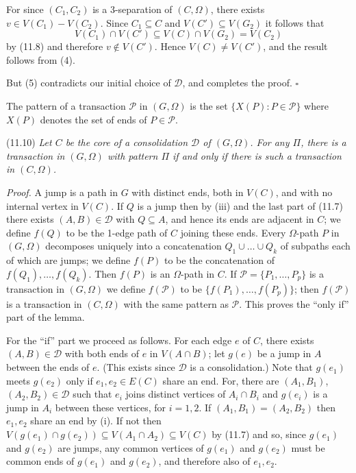 For since $(C_1, C_2)$ is a 3-separation of $(C, \Omega)$, there exists $v \in V(C_1) - V(C_2)$. Since $C_1 \subseteq C$ and $V(C') \subseteq V(G_2)$ it follows that
\begin{equation*}
V(C_1) \cap V(C') \subseteq V(C) \cap V(G_2) = V(C_2)
\end{equation*}
by (11.8) and therefore $v \notin V(C')$. Hence $V(C) \neq V(C')$, and the result follows from (4).

But (5) contradicts our initial choice of $\mathcal{D}$, and completes the proof. $\square$

The pattern of a transaction $\mathcal{P}$ in $(G, \Omega)$ is the set $\{X(P): P \in \mathcal{P}\}$ where $X(P)$ denotes the set of ends of $P \in \mathcal{P}$.

\stmt
(11.10) \textit{Let $C$ be the core of a consolidation $\mathcal{D}$ of $(G, \Omega)$. For any $\Pi$, there is a transaction in $(G, \Omega)$ with pattern $\Pi$ if and only if there is such a transaction in $(C, \Omega)$.}

\textit{Proof.} A jump is a path in $G$ with distinct ends, both in $V(C)$, and with no internal vertex in $V(C)$. If $Q$ is a jump then by (iii) and the last part of (11.7) there exists $(A, B) \in \mathcal{D}$ with $Q \subseteq A$, and hence its ends are adjacent in $C$; we define $f(Q)$ to be the 1-edge path of $C$ joining these ends. Every $\Omega$-path $P$ in $(G, \Omega)$ decomposes uniquely into a concatenation $Q_1 \cup \dots \cup Q_k$ of subpaths each of which are jumps; we define $f(P)$ to be the concatenation of $f(Q_1), \dots, f(Q_k)$. Then $f(P)$ is an $\Omega$-path in $C$. If $\mathcal{P} = \{P_1, \dots, P_p\}$ is a transaction in $(G, \Omega)$ we define $f(\mathcal{P})$ to be $\{f(P_1), \dots, f(P_p)\}$; then $f(\mathcal{P})$ is a transaction in $(C, \Omega)$ with the same pattern as $\mathcal{P}$. This proves the ``only if'' part of the lemma.

For the ``if'' part we proceed as follows. For each edge $e$ of $C$, there exists $(A, B) \in \mathcal{D}$ with both ends of $e$ in $V(A \cap B)$; let $g(e)$ be a jump in $A$ between the ends of $e$. (This exists since $\mathcal{D}$ is a consolidation.) Note that $g(e_1)$ meets $g(e_2)$ only if $e_1, e_2 \in E(C)$ share an end. For, there are $(A_1, B_1)$, $(A_2, B_2) \in \mathcal{D}$ such that $e_i$ joins distinct vertices of $A_i \cap B_i$ and $g(e_i)$ is a jump in $A_i$ between these vertices, for $i = 1, 2$. If $(A_1, B_1) = (A_2, B_2)$ then $e_1, e_2$ share an end by (i). If not then $V(g(e_1) \cap g(e_2)) \subseteq V(A_1 \cap A_2) \subseteq V(C)$ by (11.7) and so, since $g(e_1)$ and $g(e_2)$ are jumps, any common vertices of $g(e_1)$ and $g(e_2)$ must be common ends of $g(e_1)$ and $g(e_2)$, and therefore also of $e_1, e_2$.

